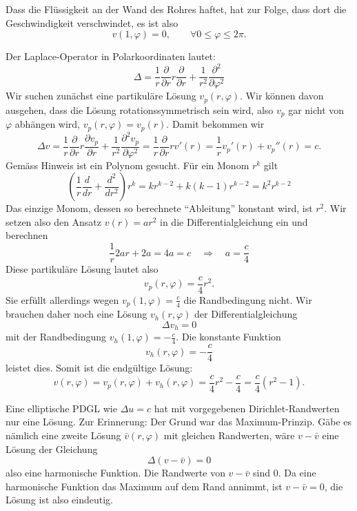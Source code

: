 \begin{loesung}
\begin{teilaufgaben}
\item Dass die Flüssigkeit an der Wand des Rohres haftet, hat zur
Folge, dass dort die Geschwindigkeit verschwindet, es ist also
\[
v(1,\varphi)=0,\qquad\forall 0\le \varphi\le 2\pi.
\]
\item Der Laplace-Operator in Polarkoordinaten lautet:
\[
\Delta
=
\frac1r\frac{\partial}{\partial r}r\frac{\partial}{\partial r}
+\frac1{r^2}\frac{\partial^2}{\partial\varphi^2}
\]
Wir suchen zunächst eine partikuläre Lösung $v_p(r,\varphi)$.
Wir können davon ausgehen, dass die Lösung rotationssymmetrisch
sein wird, also $v_p$ gar nicht von $\varphi$ abhängen wird,
$v_p(r,\varphi)=v_p(r)$. Damit bekommen wir
\[
\Delta v=
\frac1r\frac{\partial}{\partial r}r
\frac{\partial v_p}{\partial r}
+\frac1{r^2}\frac{\partial^2v_p}{\partial\varphi^2}
=
\frac1r\frac{\partial}{\partial r}rv'(r)
=
\frac1rv_p'(r)+v_p''(r)=c.
\]
Gemäss Hinweis ist ein Polynom gesucht. Für ein Monom $r^k$
gilt
\[
\left(\frac1r\frac{d}{dr}+\frac{d^2}{dr^2}\right)r^k
=kr^{k-2}+k(k-1)r^{k-2}
=k^2 r^{k-2}
\]
Das einzige Monom, dessen so berechnete ``Ableitung'' konstant wird, ist
$r^2$.
Wir
setzen also den Ansatz $v(r)=ar^2$
in die Differentialgleichung ein und berechnen
\[
\frac1r2ar+2a
=
4a
=c
\quad
\Rightarrow
\quad
a=\frac{c}{4}
\]
Diese partikuläre Lösung lautet also
\[
v_p(r,\varphi)=\frac{c}{4}r^2.
\]
Sie erfüllt allerdings wegen $v_p(1,\varphi)=\frac{c}{4}$ die
Randbedingung nicht. Wir brauchen daher noch eine
Lösung $v_h(r,\varphi)$ der Differentialgleichung
\[
\Delta v_h=0
\]
mit der Randbedingung $v_h(1,\varphi)=-\frac{c}{4}$. Die konstante
Funktion
\[
v_h(r,\varphi)=-\frac{c}{4}
\]
leistet dies. Somit ist die endgültige Lösung:
\[
v(r,\varphi)=v_p(r,\varphi)+v_h(r,\varphi)=\frac{c}{4}r^2 -\frac{c}{4}=
\frac{c}{4}(r^2-1).
\]
\item Eine elliptische PDGL wie $\Delta u=c$ hat mit vorgegebenen
Dirichlet-Randwerten nur eine Lösung. Zur Erinnerung: Der Grund
war das Maximum-Prinzip.
Gäbe es nämlich eine zweite Lösung $\bar v(r,\varphi)$ mit gleichen
Randwerten, wäre
$v-\bar v$ eine Lösung der Gleichung
\[
\Delta (v-\bar v)=0
\]
also eine harmonische Funktion. Die Randwerte von $v-\bar v$ sind $0$.
Da eine harmonische Funktion das Maximum auf dem Rand annimmt, ist
$v-\bar v=0$, die  Lösung ist also eindeutig.
\qedhere
\end{teilaufgaben}
\end{loesung}
